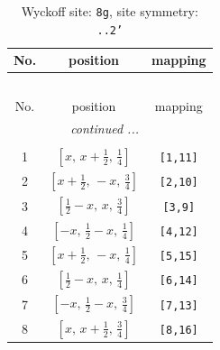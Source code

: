 \documentclass[fleqn,8pt]{jsarticle}
\begin{document}
\begin{longtable}{ccc}
\caption{Wyckoff site: {\tt 8g}, site symmetry: {\tt ..2'}}
 \\
 \hline \hline
No. & position & mapping \\ \hline \endfirsthead

\multicolumn{2}{l}{\tablename\ \thetable{}} \\
 \hline \hline
No. & position & mapping \\ \hline \endhead

 \hline \hline
\multicolumn{2}{r}{\footnotesize\it continued ...} \\ \endfoot

 \hline \hline
\multicolumn{2}{r}{} \\ \endlastfoot

1 & $\left[ x,\, x + \frac{1}{2},\, \frac{1}{4} \right]$ & {\tt [1,11]} \\ \hline
2 & $\left[ x + \frac{1}{2},\, - x,\, \frac{3}{4} \right]$ & {\tt [2,10]} \\ \hline
3 & $\left[ \frac{1}{2} - x,\, x,\, \frac{3}{4} \right]$ & {\tt [3,9]} \\ \hline
4 & $\left[ - x,\, \frac{1}{2} - x,\, \frac{1}{4} \right]$ & {\tt [4,12]} \\ \hline
5 & $\left[ x + \frac{1}{2},\, - x,\, \frac{1}{4} \right]$ & {\tt [5,15]} \\ \hline
6 & $\left[ \frac{1}{2} - x,\, x,\, \frac{1}{4} \right]$ & {\tt [6,14]} \\ \hline
7 & $\left[ - x,\, \frac{1}{2} - x,\, \frac{3}{4} \right]$ & {\tt [7,13]} \\ \hline
8 & $\left[ x,\, x + \frac{1}{2},\, \frac{3}{4} \right]$ & {\tt [8,16]} \\
\end{longtable}
\renewcommand{\arraystretch}{1.2}
\end{document}
